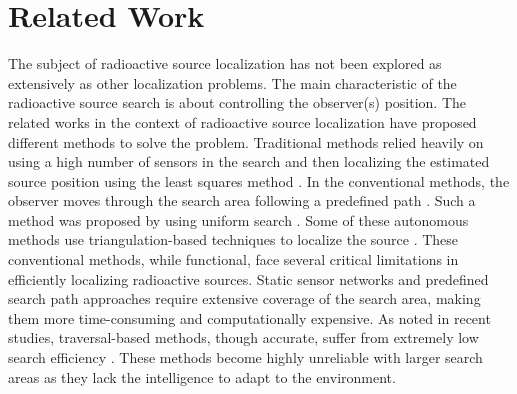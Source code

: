 \documentclass[../report.tex]{subfiles}
\begin{document}
    \section{Related Work}
    \label{sec:related_work}

    The subject of radioactive source localization has not been explored as extensively as other localization problems. The main characteristic of the radioactive source search is about 
    controlling the observer(s) position. The related works in the context of radioactive source localization have proposed different methods to solve the problem. Traditional methods relied heavily on using a high number of sensors in the search and then localizing the estimated source position using the least squares method \cite{huang2001real} \cite{howse2001least}. 
    In the conventional methods, the observer moves through the search area following a predefined path \cite{ristic2010information}. Such a method was proposed by using uniform search \cite{ziock2002lost}.
    Some of these autonomous methods use triangulation-based techniques to localize the source \cite{fragkos2020} \cite{liu2010simulation}. These conventional methods, while functional, 
    face several critical limitations in efficiently localizing radioactive sources. Static sensor networks and predefined search path approaches require extensive coverage of the search area, making them 
    more time-consuming and computationally expensive. As noted in recent studies, traversal-based methods, though accurate, suffer from extremely low search efficiency \cite{hu2024autonomous}. These methods
    become highly unreliable with larger search areas as they lack the intelligence to adapt to the environment. 
        
\end{document}
